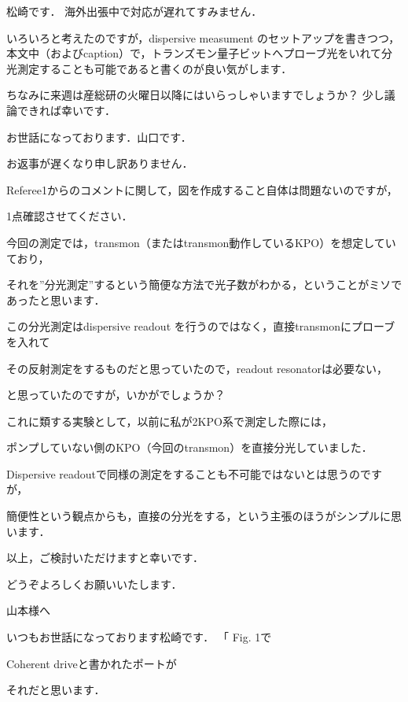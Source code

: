  




松崎です．
海外出張中で対応が遅れてすみません．

いろいろと考えたのですが，dispersive measument のセットアップを書きつつ，本文中（およびcaption）で，トランズモン量子ビットへプローブ光をいれて分光測定することも可能であると書くのが良い気がします．

ちなみに来週は産総研の火曜日以降にはいらっしゃいますでしょうか？
少し議論できれば幸いです．

 

お世話になっております．山口です．

お返事が遅くなり申し訳ありません．

 

Referee1からのコメントに関して，図を作成すること自体は問題ないのですが，

1点確認させてください．

今回の測定では，transmon（またはtransmon動作しているKPO）を想定していており，

それを”分光測定”するという簡便な方法で光子数がわかる，ということがミソであったと思います．

この分光測定はdispersive readout を行うのではなく，直接transmonにプローブを入れて

その反射測定をするものだと思っていたので，readout resonatorは必要ない，

と思っていたのですが，いかがでしょうか？

 

これに類する実験として，以前に私が2KPO系で測定した際には，

ポンプしていない側のKPO（今回のtransmon）を直接分光していました．

 

Dispersive readoutで同様の測定をすることも不可能ではないとは思うのですが，

簡便性という観点からも，直接の分光をする，という主張のほうがシンプルに思います．

 

以上，ご検討いただけますと幸いです．

どうぞよろしくお願いいたします．





山本様へ

いつもお世話になっております松崎です．
「
Fig. 1で

Coherent driveと書かれたポートが

それだと思います．

